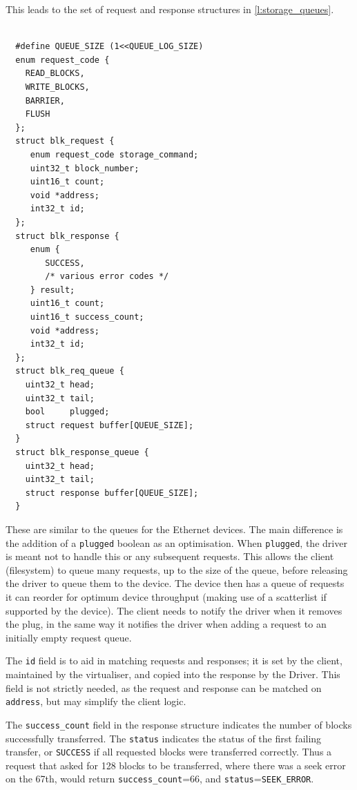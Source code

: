 \documentclass[a4paper,12pt]{report}
\newcommand{\code}[1]{\texttt{#1}}
\begin{document}
This leads to the set of request and response structures in \autoref{l:storage_queues}.

\begin{lstlisting}[gobble=2,firstline=2,float=th,
  label={l:storage_queues},
  caption={Storage request and response queue data structures.}]

  #define QUEUE_SIZE (1<<QUEUE_LOG_SIZE)
  enum request_code {
    READ_BLOCKS,
    WRITE_BLOCKS,
    BARRIER,
    FLUSH
  };
  struct blk_request {
     enum request_code storage_command;
     uint32_t block_number;
     uint16_t count;
     void *address;
     int32_t id;
  };
  struct blk_response {
     enum {
        SUCCESS,
        /* various error codes */
     } result;
     uint16_t count;
     uint16_t success_count;
     void *address;
     int32_t id;
  };
  struct blk_req_queue {
    uint32_t head;
    uint32_t tail;
    bool     plugged;
    struct request buffer[QUEUE_SIZE];
  }
  struct blk_response_queue {
    uint32_t head;
    uint32_t tail;
    struct response buffer[QUEUE_SIZE];
  }
\end{lstlisting}

These are similar to the queues for the Ethernet devices.  The
main difference is the addition of a \code{plugged} boolean as an
optimisation.
When \code{plugged}, the driver is meant not to handle this or any
subsequent requests.  This allows the client (filesystem) to queue many requests,
up to the size of the queue, before releasing the driver to queue them
to the device.  The device then has a queue of requests it can reorder
for optimum device throughput (making use of a scatterlist if
supported by the device).  The client needs to notify the driver
when it removes the plug, in the same way it notifies the driver when
adding a request to an initially empty request queue.

The \code{id} field is to aid in matching requests and responses; it
is set by the client, maintained by the virtualiser, and copied into the response by the Driver.
This field is not strictly needed, as the request and response can
be matched on \code{address}, but may simplify the client logic.

The \code{success\_count} field in
the response structure indicates the number of
blocks successfully transferred. The \code{status} indicates the status of
the first failing transfer, or \code{SUCCESS} if all requested blocks were
transferred correctly.  Thus a request that asked for 128 blocks to be
transferred, where there was a seek error on the 67th, would return
\code{success\_count}=66, and \code{status}=\code{SEEK\_ERROR}.
\end{document}
